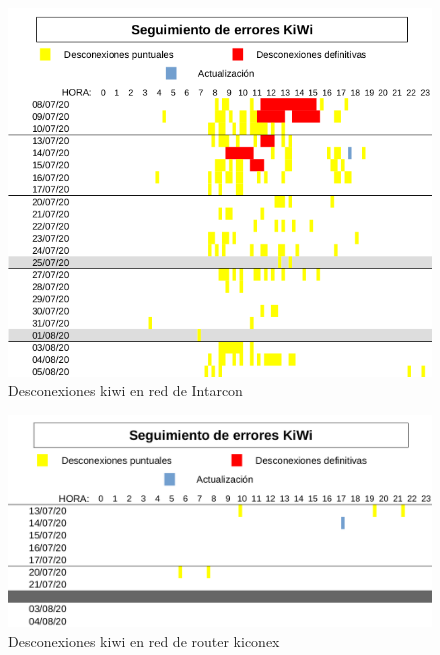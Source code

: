 \clearpage
\vspace*{\fill}
\begin{figure}[H]
  \centering
  \includegraphics[width=\textwidth, keepaspectratio]{img/erroresRedIntarcon}
  \caption{Desconexiones kiwi en red de Intarcon}
  \label{figura:erroresIntarcon}
\end{figure}
\vspace*{\fill}

\clearpage
\vspace*{\fill}
\begin{figure}[H]
  \centering
  \includegraphics[width=\textwidth, keepaspectratio]{img/erroresRedRouter}
  \caption{Desconexiones kiwi en red de router kiconex}
  \label{figura:erroresRouter}
\end{figure}
\vspace*{\fill}
\clearpage

